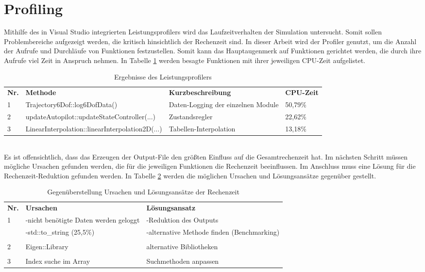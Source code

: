 \section{Profiling}
Mithilfe des in Visual Studio integrierten Leistungsprofilers  wird das Laufzeitverhalten der Simulation untersucht. Somit sollen Problembereiche aufgezeigt werden, die kritisch hinsichtlich der Rechenzeit sind. In dieser Arbeit wird der Profiler genutzt, um die Anzahl der Aufrufe und Durchläufe von Funktionen festzustellen. Somit kann das Hauptaugenmerk auf Funktionen gerichtet werden, die durch ihre Aufrufe viel Zeit in Anspruch nehmen. In Tabelle \ref{tab:.profiler} werden besagte Funktionen mit ihrer jeweiligen CPU-Zeit aufgelistet. 
\begin{table}[h]
	\centering\begin{tabular}{llp{5cm}l}
	\textbf{Nr.} &	\textbf{Methode} & \textbf{Kurzbeschreibung} &\textbf{CPU-Zeit}\\
	1&	Trajectory6Dof::log6DofData() & Daten-Logging der einzelnen Module&50,79\% \\
	2&	updateAutopilot::updateStateController(...) & Zustandsregler & 22,62\% \\
	3&	LinearInterpolation::linearInterpolation2D(...) & Tabellen-Interpolation & 13,18\%
	\end{tabular}
\caption{Ergebnisse des Leistungsprofilers}
\label{tab:.profiler}
\end{table}\noindent\\
Es ist offensichtlich, dass das Erzeugen der Output-File den größten Einfluss auf die Gesamtrechenzeit hat. Im nächsten Schritt müssen mögliche Ursachen gefunden werden, die für die jeweiligen Funktionen die Rechenzeit beeinflussen. Im Anschluss muss eine Lösung für die Rechenzeit-Reduktion gefunden werden. In Tabelle \ref{tab:korrektur} werden die möglichen Ursachen und Lösungsansätze gegenüber gestellt.
\begin{table}[h]
	\centering\begin{tabular}{lp{6cm}p{4cm}}
		\textbf{Nr.} & \textbf{Ursachen} & \textbf{Lösungsansatz}\\
		1 & -nicht benötigte Daten werden geloggt & -Reduktion des Outputs \\
									  & -std::to\_string (25,5\%) & -alternative Methode finden (Benchmarking)\\
									  &&\\
		2 & Eigen::Library & alternative Bibliotheken \\	
									  &&\\
		3	& Index suche im Array & 	Suchmethoden anpassen		
	\end{tabular}
	\caption{Gegenüberstellung Ursachen und Lösungsansätze der Rechenzeit}
	\label{tab:korrektur}
\end{table}
